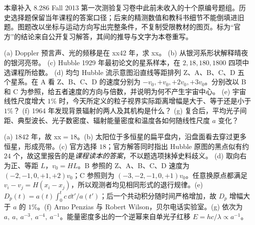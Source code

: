 本章补入 8.286 Fall 2013 第一次测验复习卷中此前未收入的十个原编号题组。历史选择题保留当年课程的答案口径；后来的精测数值和教科书细节不能倒填进旧题。图题改以坐标与运动方向写出完整条件，不复制受限教材的图页。标为“官方”的结论来自公开复习解答，其间的推导与文字为本卷重写。

\begin{exercise}
(a) Doppler 预言声、光的频移是在 xx42 年，求 xx。
(b) 从银河系形状解释晴夜的银河亮带。
(c) Hubble 1929 年最初论文的星系样本，在 $2,18,180,1800$ 四项中选课程所给数。
(d) 均匀 Hubble 流示意图沿直线等距排列 Z、A、B、C、D 五个星系。在 A 看 Z、B、C、D 的速度分别为 $-v_0,+v_0,+2v_0,+3v_0$。分别改以 B 和 C 为参照，给五者速度的方向与倍数，并说明为何不产生宇宙中心。
(e) 宇宙线性尺度增大 $1\%$ 时，今天所定义的粒子视界实际距离增幅是大于、等于还是小于 $1\%$？
(f) 1964 年发现背景辐射的两人及其机构是什么？
(g) 复合后，平均光子间距、典型波长、光子数密度、辐射能量密度和温度各如何随线性尺度 $a$ 变化？
\end{exercise}
\begin{solution}
(a) $1842$ 年，故 xx$=18$。(b) 太阳位于多恒星的扁平盘内，沿盘面看去穿过更多恒星，形成亮带。(c) 官方选择 $18$；官方解答同时指出 Hubble 原图的黑点似有约 $24$ 个，故这里报告的是\emph{课程读本的答案}，不以题选项抹掉史料歧义。
(d) 取向右为正、等距 $L$，$v_0=HL$。B 参照的 Z、A、B、C、D 速度为 $(-2,-1,0,+1,+2)v_0$；C 参照则为 $(-3,-2,-1,0,+1)v_0$。任意换原点都满足 $v_i-v_j=H(x_i-x_j)$，所以观测者均见相同形式的退行规律。(e) $D_p(t)=a(t)\int_0^t c\,\dd t'/a(t')$；后一个共动积分随时间严格增加，故 $D_p$ 增幅大于 $a$ 的 $1\%$。(f) Arno Penzias 与 Robert Wilson，贝尔电话实验室。(g) 依次为 $a,\ a,\ a^{-3},\ a^{-4},\ a^{-1}$。能量密度多出的一个逆幂来自单光子红移 $E=hc/\lambda\propto a^{-1}$。
\end{solution}

